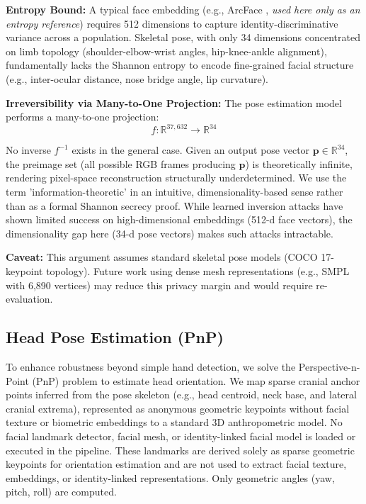 \documentclass[conference]{IEEEtran}
\begin{document}
\textbf{Entropy Bound:}
A typical face embedding (e.g., ArcFace \cite{arcface}, \textit{used here only as an entropy reference}) requires 512 dimensions to capture identity-discriminative variance across a population. Skeletal pose, with only 34 dimensions concentrated on limb topology (shoulder-elbow-wrist angles, hip-knee-ankle alignment), fundamentally lacks the Shannon entropy to encode fine-grained facial structure (e.g., inter-ocular distance, nose bridge angle, lip curvature).

\textbf{Irreversibility via Many-to-One Projection:}
The pose estimation model performs a many-to-one projection:
$$f: \mathbb{R}^{37,632} \to \mathbb{R}^{34}$$

No inverse $f^{-1}$ exists in the general case. Given an output pose vector $\mathbf{p} \in \mathbb{R}^{34}$, the preimage set (all possible RGB frames producing $\mathbf{p}$) is theoretically infinite, rendering pixel-space reconstruction structurally underdetermined. We use the term 'information-theoretic' in an intuitive, dimensionality-based sense rather than as a formal Shannon secrecy proof. While learned inversion attacks \cite{b22} have shown limited success on high-dimensional embeddings (512-d face vectors), the dimensionality gap here (34-d pose vectors) makes such attacks intractable.

\textbf{Caveat:} This argument assumes standard skeletal pose models (COCO 17-keypoint topology). Future work using dense mesh representations (e.g., SMPL with 6,890 vertices) may reduce this privacy margin and would require re-evaluation.

\subsection{Head Pose Estimation (PnP)}
To enhance robustness beyond simple hand detection, we solve the Perspective-n-Point (PnP) problem to estimate head orientation. We map sparse cranial anchor points inferred from the pose skeleton (e.g., head centroid, neck base, and lateral cranial extrema), represented as anonymous geometric keypoints without facial texture or biometric embeddings to a standard 3D anthropometric model. No facial landmark detector, facial mesh, or identity-linked facial model is loaded or executed in the pipeline. These landmarks are derived solely as sparse geometric keypoints for orientation estimation and are not used to extract facial texture, embeddings, or identity-linked representations. Only geometric angles (yaw, pitch, roll) are computed.
\end{document}
